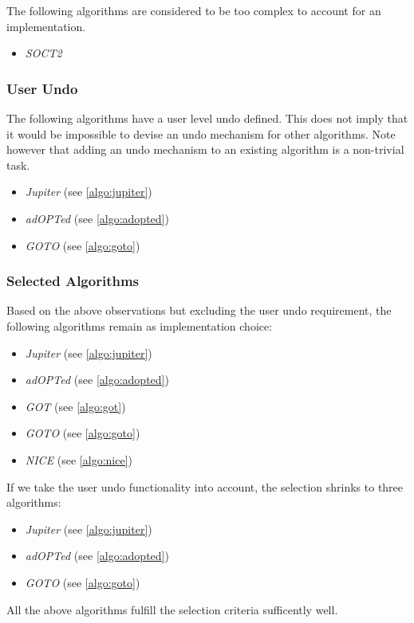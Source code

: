 The following algorithms are considered to be too complex to account for an implementation.
\begin{itemize}
 \item \emph{SOCT2}
\end{itemize}


\subsubsection{User Undo}
The following algorithms have a user level undo defined. This does not imply that it would be impossible to devise an undo mechanism for other algorithms. Note however that adding an undo mechanism to an existing algorithm is a non-trivial task.

\begin{itemize}
 \item \emph{Jupiter} (see \ref{algo:jupiter}) 
 \item \emph{adOPTed} (see \ref{algo:adopted})
 \item \emph{GOTO} (see \ref{algo:goto})
\end{itemize}


\subsubsection{Selected Algorithms}
Based on the above observations but excluding the user undo requirement, the following algorithms remain as implementation choice:

\begin{itemize}
 \item \emph{Jupiter} (see \ref{algo:jupiter})
 \item \emph{adOPTed} (see \ref{algo:adopted})
 \item \emph{GOT} (see \ref{algo:got})
 \item \emph{GOTO} (see \ref{algo:goto})
 \item \emph{NICE} (see \ref{algo:nice})
\end{itemize}

If we take the user undo functionality into account, the selection shrinks to three algorithms:
\begin{itemize}
 \item \emph{Jupiter} (see \ref{algo:jupiter}) 
 \item \emph{adOPTed} (see \ref{algo:adopted})
 \item \emph{GOTO} (see \ref{algo:goto})
\end{itemize}

All the above algorithms fulfill the selection criteria sufficently well.